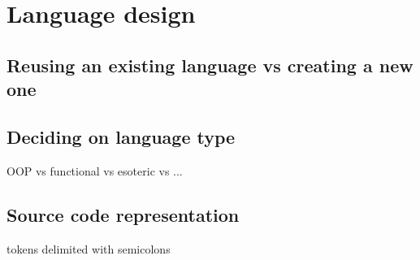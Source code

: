 \chapter{Language design}

\section{Reusing an existing language vs creating a new one}

\section{Deciding on language type}
OOP vs functional vs esoteric vs ...

\section{Source code representation}
tokens delimited with semicolons